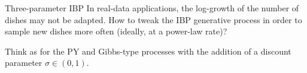 \begin{frame}{Three-parameter IBP}
In real-data applications, the log-growth of the number of dishes may not be adapted. How to tweak the IBP generative process in order to sample new dishes more often (ideally, at a power-law rate)?\pause

Think as for the PY and Gibbs-type processes with the addition of a \alert{discount} parameter $\sigma\in(0,1)$.
	
\end{frame}